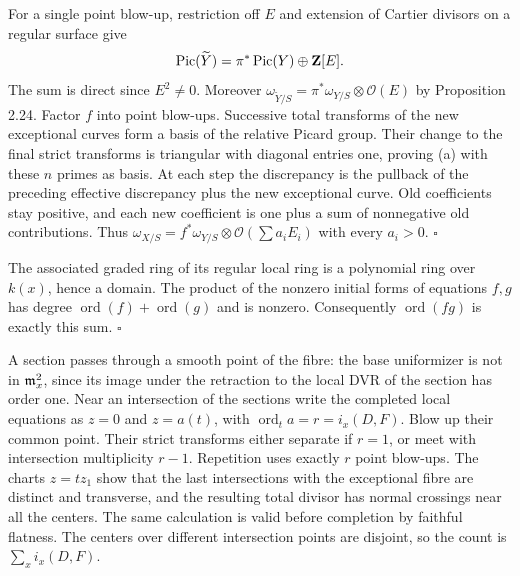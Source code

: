 \documentclass[11pt]{article}
\let\chapterexercise\exercise
\renewcommand{\exercise}[2]{\Needspace{8\baselineskip}\chapterexercise{#1}{#2}}
\begin{document}
\pf For a single point blow-up, restriction off $E$ and extension of Cartier divisors on a regular surface give
\[ \operatorname{Pic}(\widetilde Y)=\pi^*\operatorname{Pic}(Y)\oplus\mathbf Z[E]. \]
The sum is direct since $E^2\ne0$. Moreover $\omega_{\widetilde Y/S}=\pi^*\omega_{Y/S}\otimes\mathcal O(E)$ by Proposition 2.24. Factor $f$ into point blow-ups. Successive total transforms of the new exceptional curves form a basis of the relative Picard group. Their change to the final strict transforms is triangular with diagonal entries one, proving (a) with these $n$ primes as basis. At each step the discrepancy is the pullback of the preceding effective discrepancy plus the new exceptional curve. Old coefficients stay positive, and each new coefficient is one plus a sum of nonnegative old contributions. Thus $\omega_{X/S}=f^*\omega_{Y/S}\otimes\mathcal O(\sum a_iE_i)$ with every $a_i>0$. \hfill$\square$

\pf The associated graded ring of its regular local ring is a polynomial ring over $k(x)$, hence a domain. The product of the nonzero initial forms of equations $f,g$ has degree $\operatorname{ord}(f)+\operatorname{ord}(g)$ and is nonzero. Consequently $\operatorname{ord}(fg)$ is exactly this sum. \hfill$\square$

\pf A section passes through a smooth point of the fibre: the base uniformizer is not in $\mathfrak m_x^2$, since its image under the retraction to the local DVR of the section has order one. Near an intersection of the sections write the completed local equations as $z=0$ and $z=a(t)$, with $\operatorname{ord}_t a=r=i_x(D,F)$. Blow up their common point. Their strict transforms either separate if $r=1$, or meet with intersection multiplicity $r-1$. Repetition uses exactly $r$ point blow-ups. The charts $z=tz_1$ show that the last intersections with the exceptional fibre are distinct and transverse, and the resulting total divisor has normal crossings near all the centers. The same calculation is valid before completion by faithful flatness. The centers over different intersection points are disjoint, so the count is $\sum_x i_x(D,F)$.
\end{document}
